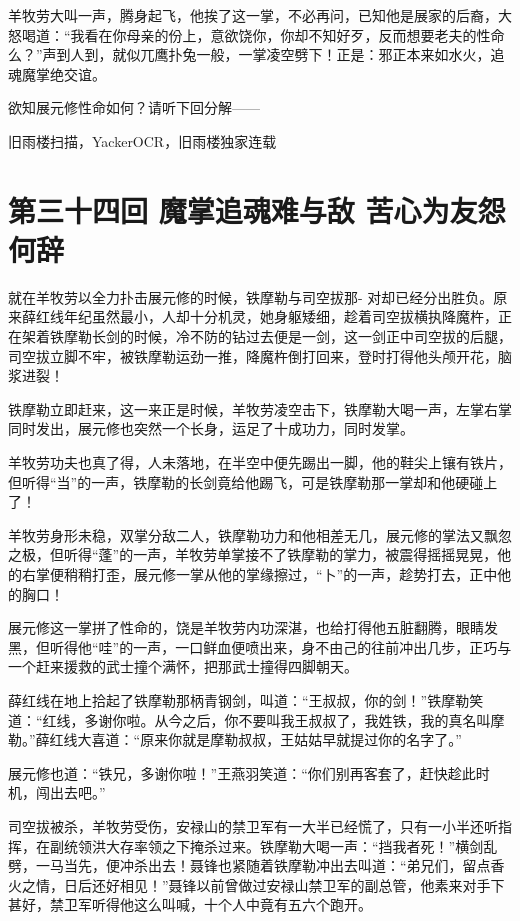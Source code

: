 \documentclass[12pt,oneside]{book}
\begin{document}
羊牧劳大叫一声，腾身起飞，他挨了这一掌，不必再问，已知他是展家的后裔，大怒喝道：``我看在你母亲的份上，意欲饶你，你却不知好歹，反而想要老夫的性命么？''声到人到，就似兀鹰扑兔一般，一掌凌空劈下！正是：邪正本来如水火，追魂魔掌绝交谊。

欲知展元修性命如何？请听下回分解------

旧雨楼扫描，YackerOCR，旧雨楼独家连载

\chapter{第三十四回 魔掌追魂难与敌
苦心为友怨何辞}\label{ux7b2cux4e09ux5341ux56dbux56de-ux9b54ux638cux8ffdux9b42ux96beux4e0eux654c-ux82e6ux5fc3ux4e3aux53cbux6028ux4f55ux8f9e}

就在羊牧劳以全力扑击展元修的时候，铁摩勒与司空拔那-
对却已经分出胜负。原来薛红线年纪虽然最小，人却十分机灵，她身躯矮细，趁着司空拔横执降魔杵，正在架着铁摩勒长剑的时候，冷不防的钻过去便是一剑，这一剑正中司空拔的后腿，司空拔立脚不牢，被铁摩勒运劲一推，降魔杵倒打回来，登时打得他头颅开花，脑浆进裂！

铁摩勒立即赶来，这一来正是时候，羊牧劳凌空击下，铁摩勒大喝一声，左掌右掌同时发出，展元修也突然一个长身，运足了十成功力，同时发掌。

羊牧劳功夫也真了得，人未落地，在半空中便先踢出一脚，他的鞋尖上镶有铁片，但听得``当''的一声，铁摩勒的长剑竟给他踢飞，可是铁摩勒那一掌却和他硬碰上了！

羊牧劳身形未稳，双掌分敌二人，铁摩勒功力和他相差无几，展元修的掌法又飘忽之极，但听得``蓬''的一声，羊牧劳单掌接不了铁摩勒的掌力，被震得摇摇晃晃，他的右掌便稍稍打歪，展元修一掌从他的掌缘擦过，``卜''的一声，趁势打去，正中他的胸口！

展元修这一掌拼了性命的，饶是羊牧劳内功深湛，也给打得他五脏翻腾，眼睛发黑，但听得他``哇''的一声，一口鲜血便喷出来，身不由己的往前冲出几步，正巧与一个赶来援救的武士撞个满怀，把那武士撞得四脚朝天。

薛红线在地上拾起了铁摩勒那柄青钢剑，叫道：``王叔叔，你的剑！''铁摩勒笑道：``红线，多谢你啦。从今之后，你不要叫我王叔叔了，我姓铁，我的真名叫摩勒。''薛红线大喜道：``原来你就是摩勒叔叔，王姑姑早就提过你的名字了。''

展元修也道：``铁兄，多谢你啦！''王燕羽笑道：``你们别再客套了，赶快趁此时机，闯出去吧。''

司空拔被杀，羊牧劳受伤，安禄山的禁卫军有一大半已经慌了，只有一小半还听指挥，在副统领洪大存率领之下掩杀过来。铁摩勒大喝一声：``挡我者死！''横剑乱劈，一马当先，便冲杀出去！聂锋也紧随着铁摩勒冲出去叫道：``弟兄们，留点香火之情，日后还好相见！''聂锋以前曾做过安禄山禁卫军的副总管，他素来对手下甚好，禁卫军听得他这么叫喊，十个人中竟有五六个跑开。
\end{document}

